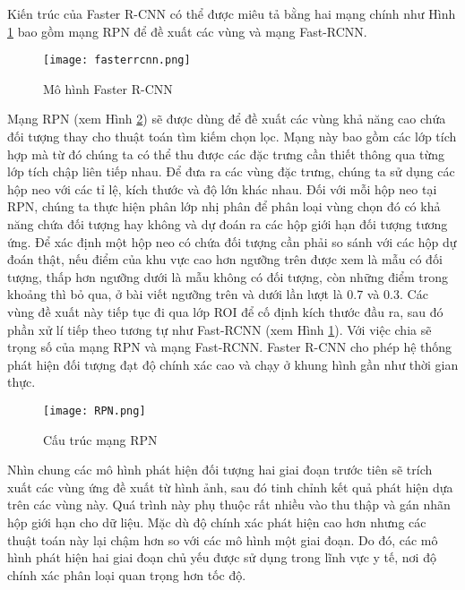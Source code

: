 \documentclass[../the.tex]{subfiles}
\begin{document}
\bigskip

{\fontsize{13}{12} \selectfont

	Kiến trúc của Faster R-CNN có thể được miêu tả bằng hai mạng chính như Hình \ref{fig:fasterrcnn} bao gồm mạng RPN để đề xuất các vùng và mạng Fast-RCNN.

}

\begin{figure}[H]
	\centering
	\texttt{[image: fasterrcnn.png]}
	\caption{Mô hình Faster R-CNN \cite{ren2016faster}}
	\label{fig:fasterrcnn}
\end{figure}

{\fontsize{13}{12} \selectfont

Mạng RPN (xem Hình \ref{fig:rpn}) sẽ được dùng để đề xuất các vùng khả năng cao chứa đối tượng thay cho thuật toán tìm kiếm chọn lọc.
Mạng này bao gồm các lớp tích hợp mà từ đó chúng ta có thể thu được các đặc trưng cần thiết thông qua từng lớp tích chập liên tiếp nhau.
Để đưa ra các vùng đặc trưng, chúng ta sử dụng các hộp neo với các tỉ lệ, kích thước và độ lớn khác nhau. Đối với mỗi hộp neo tại RPN, chúng ta thực hiện phân lớp nhị phân để phân loại vùng chọn đó có khả năng chứa đối tượng hay không và dự đoán ra các hộp giới hạn đối tượng tương ứng.
Để xác định một hộp neo có chứa đối tượng cần phải so sánh với các hộp dự đoán thật, nếu điểm của khu vực cao hơn ngưỡng trên được xem là mẫu có đối tượng, thấp hơn ngưỡng dưới là mẫu không có đối tượng, còn những điểm trong khoảng thì bỏ qua, ở bài viết ngưỡng trên và dưới lần lượt là 0.7 và 0.3.
Các vùng đề xuất này tiếp tục đi qua lớp ROI để cố định kích thước đầu ra, sau đó phần xử lí tiếp theo tương tự như Fast-RCNN (xem Hình \ref{fig:fasterrcnn}).
Với việc chia sẽ trọng số của mạng RPN và mạng Fast-RCNN. Faster R-CNN cho phép hệ thống phát hiện đối tượng đạt độ chính xác cao và chạy ở khung hình gần như thời gian thực.

}

\begin{figure}[H]
	\centering
	\texttt{[image: RPN.png]}
	\caption{Cấu trúc mạng RPN}
	\label{fig:rpn}
\end{figure}

{\fontsize{13}{12} \selectfont

Nhìn chung các mô hình phát hiện đối tượng hai giai đoạn
trước tiên sẽ trích xuất các vùng ứng đề xuất từ hình ảnh, sau đó tinh chỉnh kết quả phát hiện dựa trên các vùng này. Quá trình này phụ thuộc rất nhiều vào thu thập và gán nhãn hộp giới hạn cho dữ liệu.
Mặc dù độ chính xác phát hiện cao hơn nhưng các thuật toán này lại chậm hơn so với các mô hình một giai đoạn.
Do đó, các mô hình phát hiện hai giai đoạn chủ yếu được sử dụng trong lĩnh vực y tế, nơi độ chính xác phân loại quan trọng hơn tốc độ.

}
\end{document}

